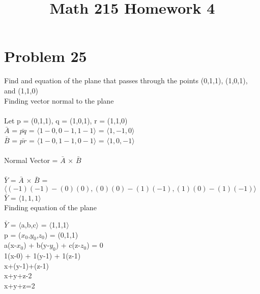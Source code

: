 \documentclass{article} %
\title{Math 215 Homework 4} %
\author{} %
\date{} %
\begin{document}
    \maketitle %
    
    \section*{Problem 25} %
    Find and equation of the plane that passes through the points (0,1,1), (1,0,1), and (1,1,0)
    \vspace{0.5in}\\
    Finding vector normal to the plane\\\\
    Let p = (0,1,1), q = (1,0,1), r = (1,1,0)\\
    $\bar{A}$ = $\bar{pq}$ = $\langle1-0,0-1,1-1\rangle$ = $\langle1,-1,0\rangle$\\
    $\bar{B}$ = $\bar{pr}$ = $\langle1-0,1-1,0-1\rangle$ = $\langle1,0,-1\rangle$\\\\
    Normal Vector = $\bar{A}$ $\times$ $\bar{B}$\\\\
    $\bar{Y}$ = $\bar{A}$ $\times$ $\bar{B}$ = $\langle(-1)(-1) - (0)(0), (0)(0) - (1)(-1), (1)(0) - (1)(-1)\rangle$\\
    $\bar{Y}$ = $\langle1,1,1\rangle$\\
    
    Finding equation of the plane
    \begin{center}
        $\bar{Y}$ = $\langle$a,b,c$\rangle$ = $\langle$1,1,1$\rangle$\\
        \vspace{0.1cm}p = ($x_0$,$y_0$,$z_0$) = (0,1,1)\\
        \vspace{0.1cm}a(x-$x_0$) + b(y-$y_0$) + c(z-$z_0$) = 0\\
        \vspace{0.1cm}1(x-0) + 1(y-1) + 1(z-1)\\
        \vspace{0.1cm}x+(y-1)+(z-1)\\
        \vspace{0.1cm}x+y+z-2\\
        \vspace{0.1cm}x+y+z=2\\
    \end{center}
    \vspace{1.5cm}
\end{document}
